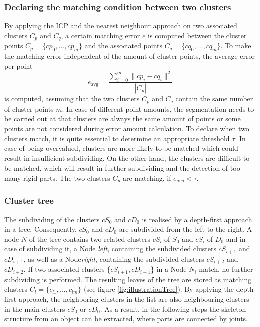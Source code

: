 \documentclass[notitlepage,english]{report}
\begin{document}
\subsubsection{Declaring the matching condition between two clusters}

By applying the ICP and the nearest neighbour approach on two associated clusters $C_p$ and $C_q$, a certain matching error $e$ is computed between the cluster points $ C_p =  \{ {cp_0, ..., cp_m}\}$ and the associated points $ C_q =  \{ {cq_0, ..., cq_m}\}$. To make the matching error independent of the amount of cluster points, the average error per point
%
\begin{equation}
e_{\mathrm{avg}} = \frac{\displaystyle\sum_{i=0}^{m}\| cp_i - cq_i\|^2}{| C_p |}
\end{equation}
%
is computed, assuming that the two clusters $C_p$ and $C_q$ contain the same number of cluster points $m$. In case of different point amounts, the segmentation needs to be carried out at that clusters are always the same amount of points or some points are not considered during error amount calculation. To declare when two clusters match, it is quite essential to determine an appropriate threshold $\tau$. In case of being overvalued, clusters are more likely to be matched which could result in insufficient subdividing. On the other hand, the clusters are difficult to be matched, which will result in further subdividing and the detection of too many rigid parts. The two clusters $C_p$ are matching, if $e_{avg} < \tau$.

\subsubsection{Cluster tree}
\label{tree}

The subdividing of the clusters $cS_0$ and $cD_0$ is realised by a depth-first approach in a tree. Consequently, $cS_0$ and $cD_0$ are subdivided from the left to the right. A node $N$ of the tree contains two related clusters $cS_i$ of $S_0$ and $cS_i$ of $D_0$ and in case of subdividing it, a Node \textit{left}, containing the subdivided clusters $cS_{i+1}$ and $cD_{i+1}$, as well as a Node\textit{right}, containing the subdivided clusters $cS_{i+2}$ and $cD_{i+2}$. If two associated clusters \{$cS_{i+1}, cD_{i+1}$\} in a Node $N_i$ match, no further subdividing is performed. The resulting leaves of the tree are stored as matching clusters $C_l = \{{c_{l1}, ... , c_{lm}}\}$ (see figure \ref{fig:illustrationTree}). By applying the depth-first approach, the neighboring clusters in the list are also neighbouring clusters in the main clusters $cS_0$ or $cD_0$.  As a result, in the following steps the skeleton structure from an object can be extracted, where parts are connected by joints.
\end{document}
